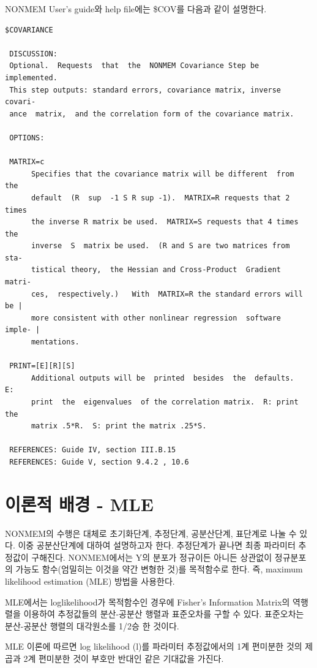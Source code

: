\documentclass[
  10pt,
]{krantz}
\begin{document}
NONMEM User's guide와 help file에는 \$COV를 다음과 같이 설명한다.

\begin{verbatim}
$COVARIANCE

 DISCUSSION:
 Optional.  Requests  that  the  NONMEM Covariance Step be implemented.
 This step outputs: standard errors, covariance matrix, inverse covari-
 ance  matrix,  and the correlation form of the covariance matrix.

 OPTIONS:

 MATRIX=c
      Specifies that the covariance matrix will be different  from  the
      default  (R  sup  -1 S R sup -1).  MATRIX=R requests that 2 times
      the inverse R matrix be used.  MATRIX=S requests that 4 times the
      inverse  S  matrix be used.  (R and S are two matrices from  sta-
      tistical theory,  the Hessian and Cross-Product  Gradient  matri-
      ces,  respectively.)   With  MATRIX=R the standard errors will be |
      more consistent with other nonlinear regression  software  imple- |
      mentations.

 PRINT=[E][R][S]
      Additional outputs will be  printed  besides  the  defaults.   E:
      print  the  eigenvalues  of the correlation matrix.  R: print the
      matrix .5*R.  S: print the matrix .25*S.

 REFERENCES: Guide IV, section III.B.15
 REFERENCES: Guide V, section 9.4.2 , 10.6
\end{verbatim}

\hypertarget{uxc774uxb860uxc801-uxbc30uxacbd---mle}{%
\section{이론적 배경 - MLE}\label{uxc774uxb860uxc801-uxbc30uxacbd---mle}}


NONMEM의 수행은 대체로 초기화단계, 추정단계, 공분산단계, 표단계로 나눌 수 있다. 이중 공분산단계에 대하여 설명하고자
한다. 추정단계가 끝나면 최종 파라미터 추정값이 구해진다. NONMEM에서는 Y의 분포가 정규이든 아니든 상관없이
정규분포의 가능도 함수(엄밀히는 이것을 약간 변형한 것)를 목적함수로 한다. 즉, maximum
likelihood estimation (MLE) 방법을 사용한다.

MLE에서는 loglikelihood가 목적함수인 경우에 Fisher's Information Matrix의 역행렬을 이용하여
추정값들의 분산-공분산 행렬과 표준오차를 구할 수 있다. 표준오차는 분산-공분산 행렬의 대각원소를 1/2승 한 것이다.

MLE 이론에 따르면 log likelihood (l)를 파라미터 추정값에서의 1계 편미분한 것의 제곱과 2계 편미분한 것이
부호만 반대인 같은 기대값을 가진다.
\end{document}
